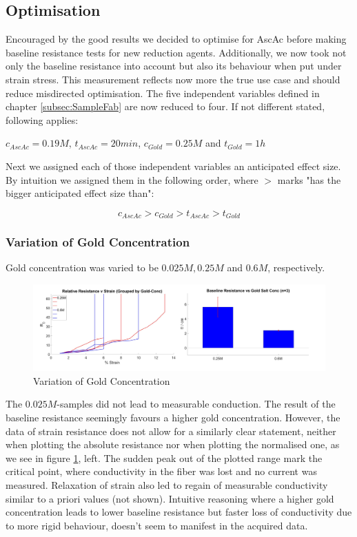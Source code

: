 \subsection{Optimisation}
Encouraged by the good results we decided to optimise for AscAc before making baseline resistance tests for new reduction agents. Additionally, we now took not only the baseline resistance into account but also its behaviour when put under strain stress. This measurement reflects now more the true use case and should reduce misdirected optimisation. The five independent variables defined in chapter \ref{subsec:SampleFab} are now reduced to four. If not different stated, following applies: \begin{center}$c_{AscAc}=0.19M$, $t_{AscAc}=20min$, $c_{Gold}=0.25M$ and $t_{Gold}=1h$
\end{center}
Next we assigned each of those independent variables an anticipated effect size. By intuition we assigned them in the following order, where $>$ marks "has the bigger anticipated effect size than":

\begin{equation}
    c_{AscAc} > c_{Gold} > t_{AscAc} > t_{Gold}
\end{equation}

\subsubsection{Variation of Gold Concentration}

Gold concentration was varied to be $0.025M, 0.25M$  and $0.6M$, respectively.

\begin{figure}[H]
    \centerline{\includegraphics[scale=0.7]{./pic/R0vGoldConc.PNG}}
    \caption{Variation of Gold Concentration}
    \label{fig:GoldConc}
\end{figure}

The $0.025M$-samples did not lead to measurable conduction. The result of the baseline resistance seemingly favours a higher gold concentration. However, the data of strain resistance does not allow for a similarly clear statement, neither when plotting the absolute resistance nor when plotting the normalised one, as we see in figure \ref{fig:GoldConc}, left. The sudden peak out of the plotted range mark the critical point, where conductivity in the fiber was lost and no current was measured. Relaxation of strain also led to regain of measurable conductivity similar to a priori values (not shown). Intuitive reasoning where a higher gold concentration leads to lower baseline resistance but faster loss of conductivity due to more rigid behaviour, doesn't seem to manifest in the acquired data.

